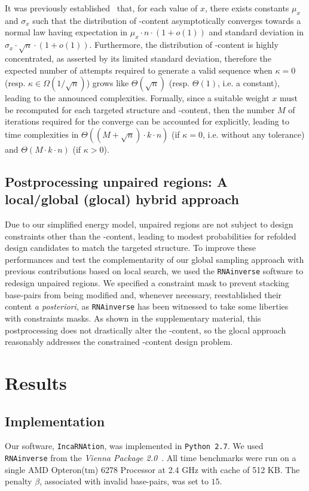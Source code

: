\documentclass{bioinfo}
\newcommand{\RNAinverse}{\texttt{RNAinverse}\xspace}
\newcommand{\GCContent}{\Gb\Cb-content\xspace}
\newcommand{\ourprog}{\texttt{IncaRNAtion}\xspace}
\newcommand{\Cb}{{\sf{C}}\xspace}
\newcommand{\Gb}{{\sf{G}}\xspace}
\begin{document}
It was previously established~\citep{Waldispuhl2011} that, for each value of $x$, there exists constants $\mu_x$ and $\sigma_x$ such that the distribution of \GCContent asymptotically converges towards a normal law having expectation in $\mu_x\cdot n\cdot(1+o(1))$ and standard deviation in $\sigma_x\cdot\sqrt{n}\cdot(1+o(1))$.
Furthermore, the distribution of \GCContent is highly concentrated, as asserted by its limited standard deviation, therefore the expected number of attempts required to generate a valid sequence when $\kappa=0$ (resp. $\kappa\in\Omega(1/\sqrt n)$) grows like $\Theta(\sqrt{n})$ (resp. $\Theta(1)$, i.e. a constant), leading to the announced complexities. Formally, since a suitable weight $x$ must be recomputed for each targeted structure and \GCContent, then the number $M$ of iterations required for the converge can be accounted for explicitly, leading to time complexities in $\Theta((M+\sqrt{n})\cdot k\cdot n)$ (if $\kappa=0$, i.e. without any tolerance) and $\Theta(M\cdot k\cdot n)$ (if $\kappa>0$).



\subsection{Postprocessing unpaired regions: A local/global (glocal) hybrid approach}
\label{subsec:glocal_method}
Due to our simplified energy model, unpaired regions are not subject to design constraints other than the \GCContent, leading to modest probabilities for refolded design candidates to match the targeted structure. To improve these performances and test the complementarity  of our global sampling approach with previous contributions based on local search, we used the \RNAinverse software to redesign unpaired regions. We specified a constraint mask to prevent stacking base-pairs from being modified and, whenever necessary, reestablished their content {\em a posteriori}, as \RNAinverse has been witnessed to take some liberties with constraints masks. As shown in the supplementary material, this postprocessing does not drastically alter the \GCContent, so the glocal approach reasonably addresses the constrained \GCContent design problem.

\section{Results}
\label{sec:results}

\subsection{Implementation}
\label{sec:implementation}
Our software, \ourprog, was implemented in {\tt Python~2.7}. We used
\RNAinverse from the \textit{Vienna Package 2.0}~\citep{Hofacker:1994}.
All time benchmarks were run on a single AMD Opteron(tm) 6278 Processor  at 2.4 GHz with cache of 512 KB.
The penalty $\beta$, associated with invalid base-pairs, was set to $15$.
\end{document}
